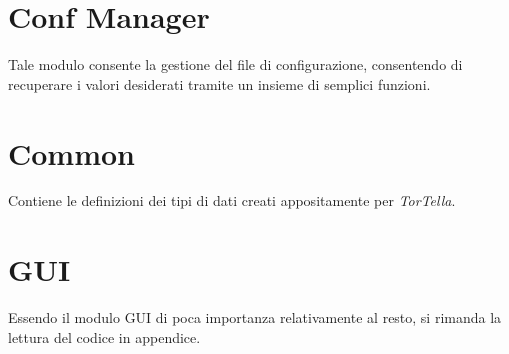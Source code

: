 \section{Conf Manager}
Tale modulo consente la gestione del file di configurazione, consentendo di recuperare i valori desiderati tramite un insieme di semplici funzioni.
\section{Common}
Contiene le definizioni dei tipi di dati creati appositamente per \textit{TorTella}.
\section{GUI}
Essendo il modulo GUI di poca importanza relativamente al resto, si rimanda la lettura del codice in appendice.
